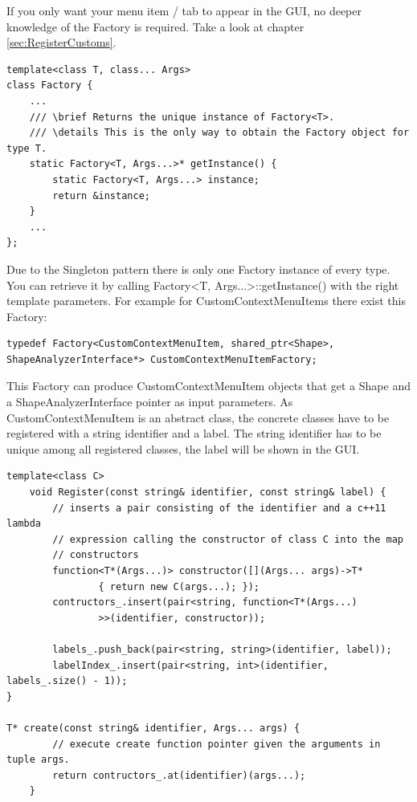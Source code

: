 \begin{mdframed}
If you only want your menu item / tab to appear in the GUI, no deeper knowledge of the Factory is required. Take a look at chapter \ref{sec:RegisterCustoms}. 
\end{mdframed}

\begin{lstlisting}[style=lstStyleCpp, caption={Factory.h}]
template<class T, class... Args>
class Factory {
    ...
    /// \brief Returns the unique instance of Factory<T>.
    /// \details This is the only way to obtain the Factory object for type T.
    static Factory<T, Args...>* getInstance() {
        static Factory<T, Args...> instance;
        return &instance;
    }
    ...
};
\end{lstlisting}

Due to the Singleton pattern there is only one Factory instance of every type. You can retrieve it by calling Factory<T, Args...>::getInstance() with the right template parameters. For example for CustomContextMenuItems there exist this Factory: 

\begin{lstlisting}[style=lstStyleCpp, numbers=none]
typedef Factory<CustomContextMenuItem, shared_ptr<Shape>, ShapeAnalyzerInterface*> CustomContextMenuItemFactory;
\end{lstlisting}

This Factory can produce CustomContextMenuItem objects that get a Shape and a ShapeAnalyzerInterface pointer as input parameters. As CustomContextMenuItem is an abstract class, the concrete classes have to be registered with a string identifier and a label. The string identifier has to be unique among all registered classes, the label will be shown in the GUI. 

\begin{lstlisting}[style=lstStyleCpp, caption=Factory.h]
template<class C>
    void Register(const string& identifier, const string& label) {
        // inserts a pair consisting of the identifier and a c++11 lambda 
        // expression calling the constructor of class C into the map 	
        // constructors
        function<T*(Args...)> constructor([](Args... args)->T* 
        		{ return new C(args...); });
        contructors_.insert(pair<string, function<T*(Args...)
        		>>(identifier, constructor));
        
        labels_.push_back(pair<string, string>(identifier, label));
        labelIndex_.insert(pair<string, int>(identifier, labels_.size() - 1));
}

T* create(const string& identifier, Args... args) {
        // execute create function pointer given the arguments in tuple args.
        return contructors_.at(identifier)(args...);
    }
\end{lstlisting}


